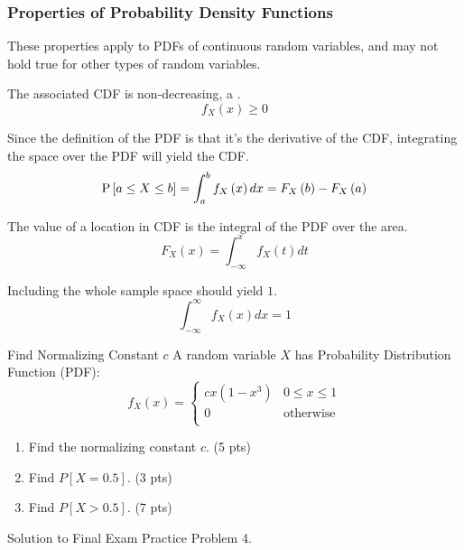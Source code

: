 		\subsubsection{Properties of Probability Density Functions} \label{subsubsec:Properties of Probability Density Functions}
			These properties apply to PDFs of continuous random variables, and may not hold true for other types of random variables.
			\begin{propertylist}
				\item The associated CDF is non-decreasing, a .
					\begin{equation}
						f_{X} \left( x \right) \geq 0
					\end{equation}
				\item Since the definition of the PDF is that it's the derivative of the CDF, integrating the space over the PDF will yield the CDF.
					\begin{equation}
						\operatorname{\operatorname{P}} \left[ a \leq X \leq b \right] = \int_{a}^{b} f_{X} \left( x \right) dx = F_{X} \left( b \right) - F_{X} \left( a \right)
					\end{equation}
				\item The value of a location in CDF is the integral of the PDF over the area.
					\begin{equation}
						F_{X} \left( x \right) = \int_{-\infty}^{x} f_{X} \left( t \right) dt
					\end{equation}
				\item Including the whole sample space should yield $1$.
					\begin{equation}
						\int_{-\infty}^{\infty} f_{X} \left( x \right) dx = 1
					\end{equation}
			\end{propertylist}
					\begin{example}{Find Normalizing Constant $c$}
						A random variable $X$ has Probability Distribution Function (PDF):
						\begin{equation*}
							f_{X}\left( x \right) = \begin{cases}
								cx \left( 1- x^{3} \right) & 0 \leq x \leq 1 \\
								0 & \text{otherwise} \\
								\end{cases}
							\end{equation*}
						\begin{enumerate}
							\item Find the normalizing constant $c$. (5 pts)
							\item Find $P \left[ X = 0.5 \right]$. (3 pts)
							\item Find $P \left[ X > 0.5 \right]$. (7 pts)
						\end{enumerate}
						
						\tcblower
						
						Solution to Final Exam Practice Problem 4.
					\end{example}
